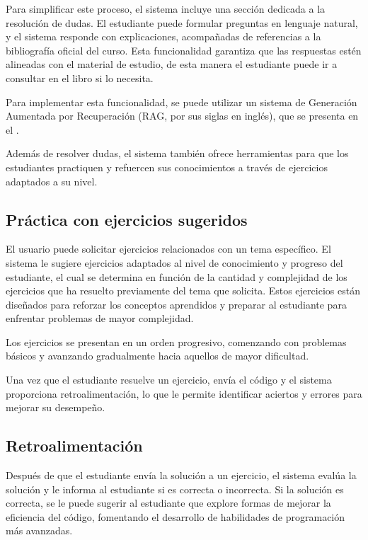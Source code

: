 Para simplificar este proceso, el sistema incluye una sección dedicada a la resolución de dudas. El estudiante puede formular preguntas en lenguaje natural, y el sistema responde con explicaciones, acompañadas de referencias a la bibliografía oficial del curso. Esta funcionalidad garantiza que las respuestas estén alineadas con el material de estudio, de esta manera el estudiante puede ir a consultar en el libro si lo necesita. 

Para implementar esta funcionalidad, se puede utilizar un sistema de Generación Aumentada por Recuperación (RAG, por sus siglas en inglés), que se presenta en el . 

Además de resolver dudas, el sistema también ofrece herramientas para que los estudiantes practiquen y refuercen sus conocimientos a través de ejercicios adaptados a su nivel.

\subsection{Práctica con ejercicios sugeridos}

El usuario puede solicitar ejercicios relacionados con un tema específico. El sistema le sugiere ejercicios adaptados al nivel de conocimiento y progreso del estudiante, el cual se determina en función de la cantidad y complejidad de los ejercicios que ha resuelto previamente del tema que solicita. Estos ejercicios están diseñados para reforzar los conceptos aprendidos y preparar al estudiante para enfrentar problemas de mayor complejidad.

Los ejercicios se presentan en un orden progresivo, comenzando con problemas básicos y avanzando gradualmente hacia aquellos de mayor dificultad.

Una vez que el estudiante resuelve un ejercicio, envía el código y el sistema proporciona retroalimentación, lo que le permite identificar aciertos y errores para mejorar su desempeño.

\subsection{Retroalimentación}

Después de que el estudiante envía la solución a un ejercicio, el sistema evalúa la solución y le informa al estudiante si es correcta o incorrecta. Si la solución es correcta, se le puede sugerir al estudiante que explore formas de mejorar la eficiencia del código, fomentando el desarrollo de habilidades de programación más avanzadas.

